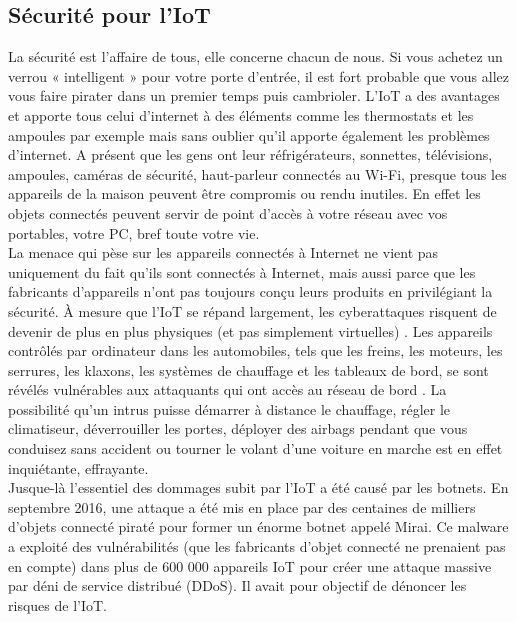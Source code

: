 	\subsection{Sécurité pour l’IoT}
La sécurité est l’af{\kern0pt}faire de tous, elle concerne chacun de nous. Si vous achetez un verrou « intelligent » pour votre porte d’entrée, il est fort probable que vous allez vous faire pirater dans un premier temps puis cambrioler. L’IoT a des avantages et apporte tous celui d’internet à des éléments comme les thermostats et les ampoules par exemple mais sans oublier qu’il apporte également les problèmes d’internet. A présent que les gens ont leur réfrigérateurs, sonnettes, télévisions, ampoules, caméras de sécurité, haut-parleur connectés au Wi-Fi, presque tous les appareils de la maison peuvent être compromis ou rendu inutiles. En ef{\kern0pt}fet les objets connectés peuvent servir de point d’accès à votre réseau avec vos portables, votre PC, bref toute votre vie.\\

La menace qui pèse sur les appareils connectés à Internet ne vient pas uniquement du fait qu’ils sont connectés à Internet, mais aussi parce que les fabricants d’appareils n’ont pas toujours conçu leurs produits en privilégiant la sécurité. À mesure que l'IoT se répand largement, les cyberattaques risquent de devenir de plus en plus physiques (et pas simplement virtuelles) \cite{clearfield2013rethinkingsiot}. Les appareils contrôlés par ordinateur dans les automobiles, tels que les freins, les moteurs, les serrures, les klaxons, les systèmes de chauf{\kern0pt}fage et les tableaux de bord, se sont révélés vulnérables aux attaquants qui ont accès au réseau de bord \cite{andy2013hackers,boyle2010proof}. La possibilité qu'un intrus puisse démarrer à distance le chauf{\kern0pt}fage, régler le climatiseur, déverrouiller les portes, déployer des airbags pendant que vous conduisez sans accident ou tourner le volant d'une voiture en marche est en ef{\kern0pt}fet inquiétante, ef{\kern0pt}frayante.\\

Jusque-là l’essentiel des dommages subit par l’IoT a été causé par les botnets. En septembre 2016, une attaque a été mis en place par des centaines de milliers d’objets connecté piraté pour former un énorme botnet appelé Mirai. Ce malware a exploité des vulnérabilités (que les fabricants d’objet connecté ne prenaient pas en compte) dans plus de 600 000 appareils IoT pour créer une attaque massive par déni de service distribué (DDoS). Il avait pour objectif de dénoncer les risques de l’IoT.\\

